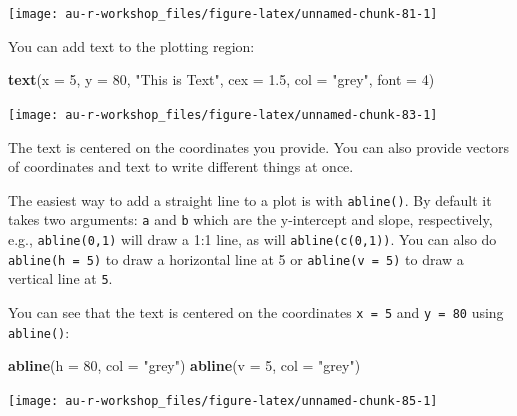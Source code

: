 \documentclass[]{book}
\newenvironment{Shaded}{\begin{snugshade}}{\end{snugshade}}
\newcommand{\DataTypeTok}[1]{\textcolor[rgb]{0.13,0.29,0.53}{#1}}
\newcommand{\DecValTok}[1]{\textcolor[rgb]{0.00,0.00,0.81}{#1}}
\newcommand{\FloatTok}[1]{\textcolor[rgb]{0.00,0.00,0.81}{#1}}
\newcommand{\KeywordTok}[1]{\textcolor[rgb]{0.13,0.29,0.53}{\textbf{#1}}}
\newcommand{\NormalTok}[1]{#1}
\newcommand{\StringTok}[1]{\textcolor[rgb]{0.31,0.60,0.02}{#1}}
\begin{document}
\begin{center}\texttt{[image: au-r-workshop\_files/figure-latex/unnamed-chunk-81-1]} \end{center}

You can add text to the plotting region:

\begin{Shaded}
\begin{Highlighting}[]
\KeywordTok{text}\NormalTok{(}\DataTypeTok{x =} \DecValTok{5}\NormalTok{, }\DataTypeTok{y =} \DecValTok{80}\NormalTok{, }\StringTok{"This is Text"}\NormalTok{, }\DataTypeTok{cex =} \FloatTok{1.5}\NormalTok{, }\DataTypeTok{col =} \StringTok{"grey"}\NormalTok{, }\DataTypeTok{font =} \DecValTok{4}\NormalTok{)}
\end{Highlighting}
\end{Shaded}

\begin{center}\texttt{[image: au-r-workshop\_files/figure-latex/unnamed-chunk-83-1]} \end{center}

The text is centered on the coordinates you provide. You can also provide vectors of coordinates and text to write different things at once.

The easiest way to add a straight line to a plot is with \texttt{abline()}. By default it takes two arguments: \texttt{a} and \texttt{b} which are the y-intercept and slope, respectively, e.g., \texttt{abline(0,1)} will draw a 1:1 line, as will \texttt{abline(c(0,1))}. You can also do \texttt{abline(h\ =\ 5)} to draw a horizontal line at 5 or \texttt{abline(v\ =\ 5)} to draw a vertical line at \texttt{5}.

You can see that the text is centered on the coordinates \texttt{x\ =\ 5} and \texttt{y\ =\ 80} using \texttt{abline()}:

\begin{Shaded}
\begin{Highlighting}[]
\KeywordTok{abline}\NormalTok{(}\DataTypeTok{h =} \DecValTok{80}\NormalTok{, }\DataTypeTok{col =} \StringTok{"grey"}\NormalTok{)}
\KeywordTok{abline}\NormalTok{(}\DataTypeTok{v =} \DecValTok{5}\NormalTok{, }\DataTypeTok{col =} \StringTok{"grey"}\NormalTok{)}
\end{Highlighting}
\end{Shaded}

\begin{center}\texttt{[image: au-r-workshop\_files/figure-latex/unnamed-chunk-85-1]} \end{center}
\end{document}
